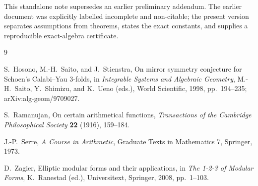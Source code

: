 \documentclass[11pt]{article}
\theoremstyle{definition}
\theoremstyle{remark}
\begin{document}
This standalone note supersedes an earlier preliminary addendum. The earlier document was explicitly labelled incomplete and non-citable; the present version separates assumptions from theorems, states the exact constants, and supplies a reproducible exact-algebra certificate.

\begin{thebibliography}{9}

S.~Hosono, M.-H.~Saito, and J.~Stienstra,
\newblock On mirror symmetry conjecture for Schoen's Calabi--Yau 3-folds,
\newblock in \emph{Integrable Systems and Algebraic Geometry},
M.-H.~Saito, Y.~Shimizu, and K.~Ueno (eds.), World Scientific, 1998, pp.~194--235;
\newblock arXiv:alg-geom/9709027.

S.~Ramanujan,
\newblock On certain arithmetical functions,
\newblock \emph{Transactions of the Cambridge Philosophical Society} \textbf{22} (1916), 159--184.

J.-P.~Serre,
\newblock \emph{A Course in Arithmetic},
\newblock Graduate Texts in Mathematics 7, Springer, 1973.

D.~Zagier,
\newblock Elliptic modular forms and their applications,
\newblock in \emph{The 1-2-3 of Modular Forms},
K.~Ranestad (ed.), Universitext, Springer, 2008, pp.~1--103.

\end{thebibliography}
\end{document}

